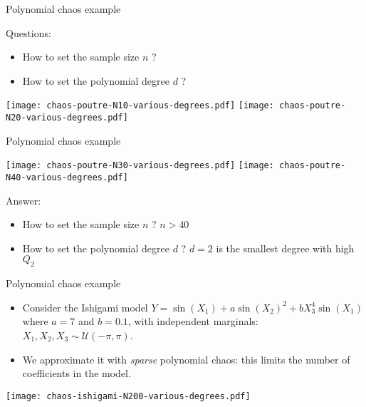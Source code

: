 \documentclass{beamer}
\begin{document}

\begin{frame}[t]{Polynomial chaos example}

Questions:
\begin{itemize}
\item How to set the sample size $n$ ?
\item How to set the polynomial degree $d$ ?
\end{itemize}

\begin{center}
\texttt{[image: chaos-poutre-N10-various-degrees.pdf]}
\texttt{[image: chaos-poutre-N20-various-degrees.pdf]}
\end{center}

\end{frame}


\begin{frame}[t]{Polynomial chaos example}

\begin{center}
\texttt{[image: chaos-poutre-N30-various-degrees.pdf]}
\texttt{[image: chaos-poutre-N40-various-degrees.pdf]}
\end{center}

Answer:
\begin{itemize}
\item How to set the sample size $n$ ? $n>40$
\item How to set the polynomial degree $d$ ? $d=2$ is the smallest 
degree with high $Q_2$
\end{itemize}


\end{frame}

\begin{frame}[t]{Polynomial chaos example}

\begin{example}
\begin{itemize}
\item Consider the Ishigami model $Y  = \sin(X_1) + a \sin(X_2)^2 + b X_3^4 \sin(X_1)$
where $a=7$ and $b=0.1$, with independent marginals: $X_1,X_2,X_3 \sim \mathcal{U}(-\pi, \pi)$.

\item We approximate it with \emph{sparse} polynomial chaos: this limits 
the number of coefficients in the model.
\end{itemize}

\end{example}

\begin{center}
 \texttt{[image: chaos-ishigami-N200-various-degrees.pdf]}
\end{center}

\end{frame}
\end{document}
